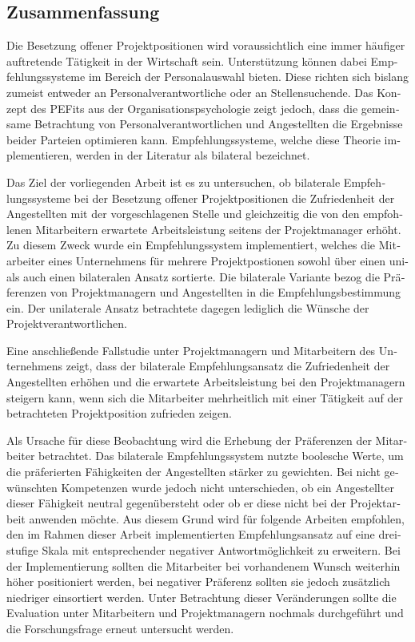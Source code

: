\begin{otherlanguage}{ngerman}
\chapter*{Zusammenfassung}
Die Besetzung offener Projektpositionen wird voraussichtlich eine immer häufiger auftretende Tätigkeit in der Wirtschaft sein. Unterstützung können dabei Empfehlungssysteme im Bereich der Personalauswahl bieten. Diese richten sich bislang zumeist entweder an Personalverantwortliche oder an Stellensuchende. Das Konzept des \aclp{PEFit} aus der Organisationspsychologie zeigt jedoch, dass die gemeinsame Betrachtung von Personalverantwortlichen und Angestellten die Ergebnisse beider Parteien optimieren kann. Empfehlungssysteme, welche diese Theorie implementieren, werden in der Literatur als bilateral bezeichnet.

Das Ziel der vorliegenden Arbeit ist es zu untersuchen, ob bilaterale Empfehlungssysteme bei der Besetzung offener Projektpositionen die Zufriedenheit der Angestellten mit der vorgeschlagenen Stelle und gleichzeitig die von den empfohlenen Mitarbeitern erwartete Arbeitsleistung seitens der Projektmanager erhöht. Zu diesem Zweck wurde ein Empfehlungssystem implementiert, welches die Mitarbeiter eines Unternehmens für mehrere Projektpostionen sowohl über einen uni- als auch einen bilateralen Ansatz sortierte. Die bilaterale Variante bezog die Präferenzen von Projektmanagern und Angestellten in die Empfehlungsbestimmung ein. Der unilaterale Ansatz betrachtete dagegen lediglich die Wünsche der Projektverantwortlichen.

Eine anschließende Fallstudie unter Projektmanagern und Mitarbeitern des Unternehmens zeigt, dass der bilaterale Empfehlungsansatz die Zufriedenheit der Angestellten erhöhen und die erwartete Arbeitsleistung bei den Projektmanagern steigern kann, wenn sich die Mitarbeiter mehrheitlich mit einer Tätigkeit auf der betrachteten Projektposition zufrieden zeigen.

Als Ursache für diese Beobachtung wird die Erhebung der Präferenzen der Mitarbeiter betrachtet. Das bilaterale Empfehlungssystem nutzte boolesche Werte, um die präferierten Fähigkeiten der Angestellten stärker zu gewichten. Bei nicht gewünschten Kompetenzen wurde jedoch nicht unterschieden, ob ein Angestellter dieser Fähigkeit neutral gegenübersteht oder ob er diese nicht bei der Projektarbeit anwenden möchte. Aus diesem Grund wird für folgende Arbeiten empfohlen, den im Rahmen dieser Arbeit implementierten Empfehlungsansatz auf eine dreistufige Skala mit entsprechender negativer Antwortmöglichkeit zu erweitern. Bei der Implementierung sollten die Mitarbeiter bei vorhandenem Wunsch weiterhin höher positioniert werden, bei negativer Präferenz sollten sie jedoch zusätzlich niedriger einsortiert werden. Unter Betrachtung dieser Veränderungen sollte die Evaluation unter Mitarbeitern und Projektmanagern nochmals durchgeführt und die Forschungsfrage erneut untersucht werden.
\end{otherlanguage}
